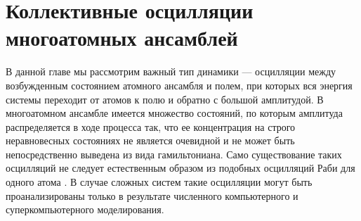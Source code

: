 \chapter{Коллективные осцилляции многоатомных ансамблей}\label{ch:ch1}
В данной главе мы рассмотрим важный тип динамики --- осцилляции между возбужденным состоянием атомного ансамбля и полем, при которых вся энергия системы переходит от атомов к полю и обратно с большой амплитудой. В многоатомном ансамбле имеется множество состояний, по которым амплитуда распределяется в ходе процесса так, что ее концентрация на строго неравновесных состояниях не является очевидной и не может быть непосредственно выведена из вида гамильтониана. Само существование таких осцилляций не следует естественным образом из подобных осцилляций Раби для одного атома \cite{rabi_1,rabi_2,rabi_3}. В случае сложных систем такие осцилляции могут быть проанализированы только в результате численного компьютерного и суперкомпьютерного моделирования.

